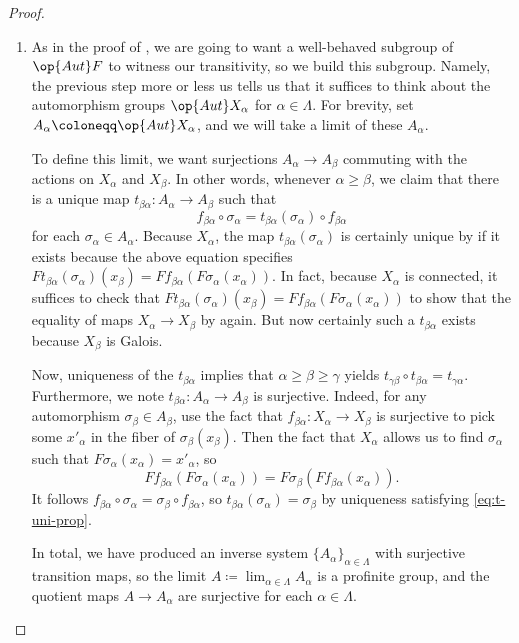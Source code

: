 \documentclass{amsart}
\begin{document}
\begin{proof}
\begin{enumerate}
        \item As in the proof of , we are going to want a well-behaved subgroup of $\op{Aut}F$ to witness our transitivity, so we build this subgroup. Namely, the previous step more or less us tells us that it suffices to think about the automorphism groups $\op{Aut}X_\alpha$ for $\alpha\in\Lambda$. For brevity, set $A_\alpha\coloneqq\op{Aut}X_\alpha$, and we will take a limit of these $A_\alpha$.

        To define this limit, we want surjections $A_\alpha\to A_\beta$ commuting with the actions on $X_\alpha$ and $X_\beta$. In other words, whenever $\alpha\ge\beta$, we claim that there is a unique map $t_{\beta\alpha}\colon A_\alpha\to A_\beta$ such that
        \begin{equation}
            f_{\beta\alpha}\circ\sigma_\alpha=t_{\beta\alpha}(\sigma_\alpha)\circ f_{\beta\alpha} \label{eq:t-uni-prop}
        \end{equation}
        for each $\sigma_\alpha\in A_\alpha$. Because $X_\alpha$, the map $t_{\beta\alpha}(\sigma_\alpha)$ is certainly unique by  if it exists because the above equation specifies $Ft_{\beta\alpha}(\sigma_\alpha)(x_\beta)=Ff_{\beta\alpha}(F\sigma_\alpha(x_\alpha))$. In fact, because $X_\alpha$ is connected, it suffices to check that $Ft_{\beta\alpha}(\sigma_\alpha)(x_\beta)=Ff_{\beta\alpha}(F\sigma_\alpha(x_\alpha))$ to show that the equality of maps $X_\alpha\to X_\beta$ by  again. But now certainly such a $t_{\beta\alpha}$ exists because $X_\beta$ is Galois.

        Now, uniqueness of the $t_{\beta\alpha}$ implies that $\alpha\ge\beta\ge\gamma$ yields $t_{\gamma\beta}\circ t_{\beta\alpha}=t_{\gamma\alpha}$. Furthermore, we note $t_{\beta\alpha}\colon A_\alpha\to A_\beta$ is surjective. Indeed, for any automorphism $\sigma_\beta\in A_\beta$, use the fact that $f_{\beta\alpha}\colon X_\alpha\to X_\beta$ is surjective to pick some $x'_\alpha$ in the fiber of $\sigma_\beta(x_\beta)$. Then the fact that $X_\alpha$ allows us to find $\sigma_\alpha$ such that $F\sigma_\alpha(x_\alpha)=x'_\alpha$, so
        \[Ff_{\beta\alpha}(F\sigma_\alpha(x_\alpha))=F\sigma_\beta(Ff_{\beta\alpha}(x_\alpha)).\]
        It follows $f_{\beta\alpha}\circ\sigma_\alpha=\sigma_\beta\circ f_{\beta\alpha}$, so $t_{\beta\alpha}(\sigma_\alpha)=\sigma_\beta$ by uniqueness satisfying \eqref{eq:t-uni-prop}.

        In total, we have produced an inverse system $\{A_\alpha\}_{\alpha\in\Lambda}$ with surjective transition maps, so the limit $A\coloneqq\lim_{\alpha\in\Lambda}A_\alpha$ is a profinite group, and the quotient maps $A\to A_\alpha$ are surjective for each $\alpha\in\Lambda$.


\end{enumerate}
\end{proof}
\end{document}
